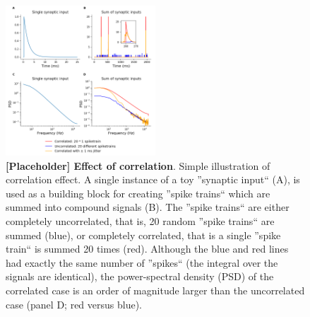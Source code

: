 \documentclass[preprint,11pt,authoryear]{elsarticle}
\begin{document}
\begin{figure}[ht!]
\begin{center}
\includegraphics[width=0.5\textwidth]{correlation_jitter}
\end{center}
\caption{\textbf{[Placeholder] Effect of correlation}. Simple illustration of correlation effect. A single instance of a toy ''synaptic input`` (A), is used as a building block for creating ''spike trains`` which are summed into compound signals (B). The ''spike trains`` are either completely uncorrelated, that is, 20 random ''spike trains`` are summed (blue), or completely correlated, that is a single ''spike train`` is summed 20 times (red). Although the blue and red lines had exactly the same number of ''spikes`` (the integral over the signals are identical), the power-spectral density (PSD) of the correlated case is an order of magnitude larger than the uncorrelated case (panel D; red versus blue).}
\label{fig:correlation_effect}
\end{figure}
\end{document}
